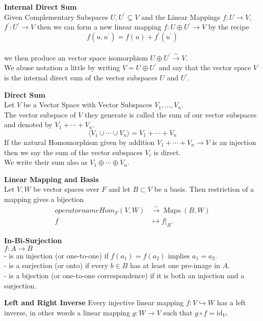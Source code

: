 \documentclass[a4paper, 10pt]{article}
\begin{document}
\begin{multicols*}{3}
\textbf{Internal Direct Sum}\\
Given Complementary Subspaces $U, U^{\prime}\subseteq V$ and the Linear Mappings $f:U\rightarrow V$, $f^{\prime}:U^{\prime}\rightarrow V$ then we can form a new linear mapping $f: U \oplus U^\prime \rightarrow V$ by the recipe $$f\left(u,u^{\prime}\right)=f\left(u\right)+ f^{\prime}\left(u^\prime\right)$$\\
we then produce an vector space isomorphism $U \oplus U^\prime \stackrel{\sim}{\rightarrow} V$. \\
We abuse notation a little by writing $V=U \oplus U^{\prime}$ and say that the vector space $V$ is the internal direct sum of the vector subspaces $U$ and $U^\prime$.

\textbf{Direct Sum}\\
Let $V$ be a Vector Space with Vector Subspaces $V_1, \ldots, V_n$. \\
The vector subspace of $V$ they generate is called the sum of our vector subspaces and denoted by $V_1+\cdots+V_n$. \\
$$\langle V_1\cup\cdots\cup V_n\rangle=V_1+\cdots+V_n$$
If the natural Homomorphism given by addition $V_1+\cdots+V_n \rightarrow V$ is an injection then we say the sum of the vector subspaces $V_i$ is direct.\\
We write their sum also as $V_1 \oplus \cdots \oplus V_n$.

\textbf{Linear Mapping and Basis}\\
Let $V, W$ be vector spaces over $F$ and let $B \subset V$ be a basis. Then restriction of a mapping gives a bijection
\begin{align*}
operatorname{Hom}_F(V, W) & \stackrel{\sim}{\rightarrow} \operatorname{Maps}(B, W) \\
f & \left.\mapsto f\right|_B .
\end{align*}

\textbf{In-Bi-Surjection}\\
$f: A \rightarrow B$\\
- is an injection (or one-to-one) if $f(a_1) = f(a_2)$ implies $a_1 = a_2$.\\
- is a surjection (or onto) if every $b \in B$ has at least one pre-image in $A$.\\
- is a bijection (or one-to-one correspondence) if it is both an injection and a surjection.

\textbf{Left and Right Inverse}
Every injective linear mapping $f: V \hookrightarrow W$ has a left inverse, in other words a linear mapping $g: W \rightarrow V$ such that $g \circ f=\mathrm{id}_V$.


\end{multicols*}
\end{document}
